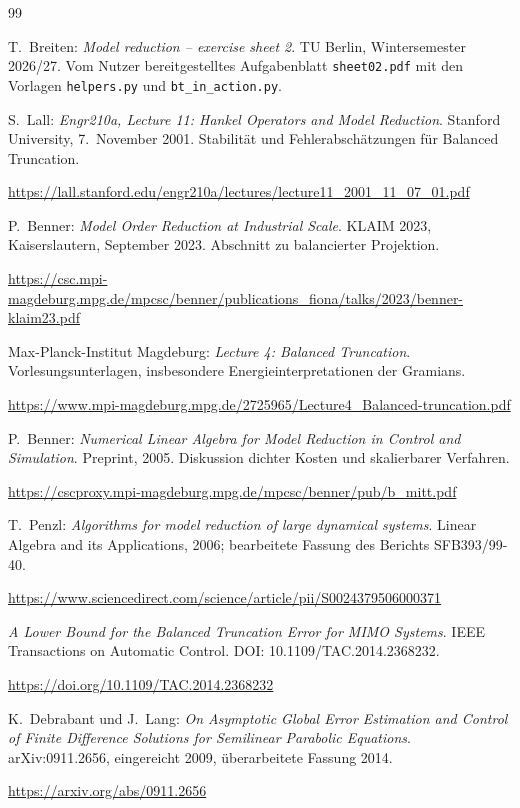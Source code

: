\documentclass[11pt,a4paper]{article}
\begin{document}
\begin{thebibliography}{99}
\raggedright
{} T.~Breiten: \emph{Model reduction -- exercise sheet 2}. TU Berlin, Wintersemester 2026/27. Vom Nutzer bereitgestelltes Aufgabenblatt \texttt{sheet02.pdf} mit den Vorlagen \texttt{helpers.py} und \texttt{bt\_in\_action.py}.

 S.~Lall: \emph{Engr210a, Lecture 11: Hankel Operators and Model Reduction}. Stanford University, 7.~November 2001. Stabilität und Fehlerabschätzungen für Balanced Truncation.\par
\url{https://lall.stanford.edu/engr210a/lectures/lecture11_2001_11_07_01.pdf}

 P.~Benner: \emph{Model Order Reduction at Industrial Scale}. KLAIM 2023, Kaiserslautern, September 2023. Abschnitt zu balancierter Projektion.\par
\url{https://csc.mpi-magdeburg.mpg.de/mpcsc/benner/publications_fiona/talks/2023/benner-klaim23.pdf}

 Max-Planck-Institut Magdeburg: \emph{Lecture 4: Balanced Truncation}. Vorlesungsunterlagen, insbesondere Energieinterpretationen der Gramians.\par
\url{https://www.mpi-magdeburg.mpg.de/2725965/Lecture4_Balanced-truncation.pdf}

 P.~Benner: \emph{Numerical Linear Algebra for Model Reduction in Control and Simulation}. Preprint, 2005. Diskussion dichter Kosten und skalierbarer Verfahren.\par
\url{https://cscproxy.mpi-magdeburg.mpg.de/mpcsc/benner/pub/b_mitt.pdf}

 T.~Penzl: \emph{Algorithms for model reduction of large dynamical systems}. Linear Algebra and its Applications, 2006; bearbeitete Fassung des Berichts SFB393/99-40.\par
\url{https://www.sciencedirect.com/science/article/pii/S0024379506000371}

 \emph{A Lower Bound for the Balanced Truncation Error for MIMO Systems}. IEEE Transactions on Automatic Control. DOI: 10.1109/TAC.2014.2368232.\par
\url{https://doi.org/10.1109/TAC.2014.2368232}

 K.~Debrabant und J.~Lang: \emph{On Asymptotic Global Error Estimation and Control of Finite Difference Solutions for Semilinear Parabolic Equations}. arXiv:0911.2656, eingereicht 2009, überarbeitete Fassung 2014.\par
\url{https://arxiv.org/abs/0911.2656}


\end{thebibliography}
\end{document}
